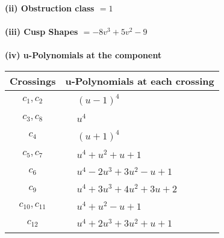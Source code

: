 \documentclass[1p]{elsarticle_modified}
\theoremstyle{definition}
\begin{document}
\flushleft \textbf{(ii) Obstruction class $= 1$}\\~\\
\flushleft \textbf{(iii) Cusp Shapes $= -8 v^3+5 v^2-9$}\\~\\
\newpage\renewcommand{\arraystretch}{1}
\flushleft \textbf{(iv) u-Polynomials at the component}\newline \\
\begin{tabular}{m{50pt}|m{274pt}}
Crossings & \hspace{64pt}u-Polynomials at each crossing \\
\hline $$\begin{aligned}c_{1},c_{2}\end{aligned}$$&$\begin{aligned}
&(u-1)^4
\end{aligned}$\\
\hline $$\begin{aligned}c_{3},c_{8}\end{aligned}$$&$\begin{aligned}
&u^4
\end{aligned}$\\
\hline $$\begin{aligned}c_{4}\end{aligned}$$&$\begin{aligned}
&(u+1)^4
\end{aligned}$\\
\hline $$\begin{aligned}c_{5},c_{7}\end{aligned}$$&$\begin{aligned}
&u^4+u^2+u+1
\end{aligned}$\\
\hline $$\begin{aligned}c_{6}\end{aligned}$$&$\begin{aligned}
&u^4-2 u^3+3 u^2- u+1
\end{aligned}$\\
\hline $$\begin{aligned}c_{9}\end{aligned}$$&$\begin{aligned}
&u^4+3 u^3+4 u^2+3 u+2
\end{aligned}$\\
\hline $$\begin{aligned}c_{10},c_{11}\end{aligned}$$&$\begin{aligned}
&u^4+u^2- u+1
\end{aligned}$\\
\hline $$\begin{aligned}c_{12}\end{aligned}$$&$\begin{aligned}
&u^4+2 u^3+3 u^2+u+1
\end{aligned}$\\
\hline
\end{tabular}\\~\\
\end{document}
